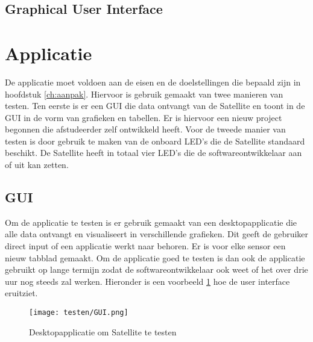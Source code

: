 \newpage

\subsection{Graphical User Interface}
\section{Applicatie}
De applicatie moet voldoen aan de eisen en de doelstellingen die bepaald zijn in hoofdstuk \ref{ch:aanpak}. Hiervoor is gebruik gemaakt van twee manieren van testen. Ten eerste is er een GUI die data ontvangt van de Satellite en toont in de GUI in de vorm van grafieken en tabellen. Er is hiervoor een nieuw project begonnen die afstudeerder zelf ontwikkeld heeft. Voor de tweede manier van testen is door gebruik te maken van de onboard LED's die de Satellite standaard beschikt. De Satellite heeft in totaal vier LED's die de softwareontwikkelaar aan of uit kan zetten. 



\subsection{GUI}
Om de applicatie te testen is er gebruik gemaakt van een desktopapplicatie die alle data ontvangt en visualiseert in verschillende grafieken. Dit geeft de gebruiker direct input of een applicatie werkt naar behoren. Er is voor elke sensor een nieuw tabblad gemaakt. Om de applicatie goed te testen is dan ook de applicatie gebruikt op lange termijn zodat de softwareontwikkelaar ook weet of het over drie uur nog steeds zal werken. Hieronder is een voorbeeld \ref{fig:guitest} hoe de user interface eruitziet. 
\begin{figure}[h!]
	\centering
	\label{fig:guitest}
	\texttt{[image: testen/GUI.png]}
	\caption{Desktopapplicatie om Satellite te testen}
\end{figure}

\newpage
